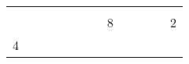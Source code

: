 \documentclass[12pt]{article}
\begin{document}
\begin{table}[]
{\begin{tabular}{clllllllllllllllllllllllllllllll}
\multicolumn{5}{|c|}{\cellcolor[HTML]{96FFFB}}                                                                                                               & \multicolumn{1}{l|}{} & \multicolumn{1}{l|}{} & \multicolumn{1}{l|}{} & \multicolumn{1}{l|}{} & \multicolumn{1}{l|}{} & \multicolumn{10}{l|}{\cellcolor[HTML]{FFFE65}}                                                                                                                                                                                                & \multicolumn{8}{l|}{\cellcolor[HTML]{FFFE65}}                                                                                                                                                  & \multicolumn{4}{l|}{\cellcolor[HTML]{67FD9A}}                                                 \\ \cline{6-10}
\multicolumn{5}{|c|}{\cellcolor[HTML]{96FFFB}}                                                                                                               & \multicolumn{1}{l|}{} & \multicolumn{1}{l|}{} & \multicolumn{1}{l|}{} & \multicolumn{1}{l|}{} & \multicolumn{1}{l|}{} & \multicolumn{10}{l|}{\cellcolor[HTML]{FFFE65}}                                                                                                                                                                                                & \multicolumn{8}{l|}{\multirow{-4}{*}{\cellcolor[HTML]{FFFE65}8}}                                                                                                                               & \multicolumn{4}{l|}{\multirow{-4}{*}{\cellcolor[HTML]{67FD9A}2}}                              \\ \cline{6-10} \cline{21-32} 
\multicolumn{5}{|c|}{\multirow{-14}{*}{\cellcolor[HTML]{96FFFB}4}}                                                                                           & \multicolumn{1}{l|}{} & \multicolumn{1}{l|}{} & \multicolumn{1}{l|}{} & \multicolumn{1}{l|}{} & \multicolumn{1}{l|}{} & \multicolumn{10}{l|}{\cellcolor[HTML]{FFFE65}}                                                                                                                                                                                                & \multicolumn{1}{l|}{} & \multicolumn{1}{l|}{} & \multicolumn{1}{l|}{} & \multicolumn{1}{l|}{} & \multicolumn{1}{l|}{} & \multicolumn{7}{l|}{\cellcolor[HTML]{67FD9A}}                                                                                                                          \\ \cline{1-10} \cline{21-25}

\end{tabular}}
\end{table}
\end{document}
